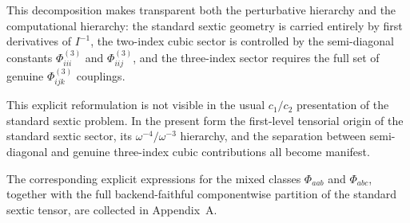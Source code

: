 \documentclass[aip,jcp,reprint,floatfix]{revtex4-2}
\begin{document}
This decomposition makes transparent both the perturbative hierarchy
and the computational hierarchy: the standard sextic geometry is
carried entirely by first derivatives of $I^{-1}$, the two-index cubic
sector is controlled by the semi-diagonal constants $\Phi^{(3)}_{iii}$
and $\Phi^{(3)}_{iij}$, and the three-index sector requires the full
set of genuine $\Phi^{(3)}_{ijk}$ couplings.

This explicit reformulation is not visible in the
usual $c_1/c_2$ presentation of the standard sextic problem. In the
present form the first-level tensorial origin of the standard sextic
sector, its $\omega^{-4}/\omega^{-3}$ hierarchy, and the separation
between semi-diagonal and genuine three-index cubic contributions all
become manifest.

The corresponding explicit expressions for the mixed classes
$\Phi_{aab}$ and $\Phi_{abc}$, together with the full backend-faithful
componentwise partition of the standard sextic tensor, are collected
in Appendix~A.
\end{document}
